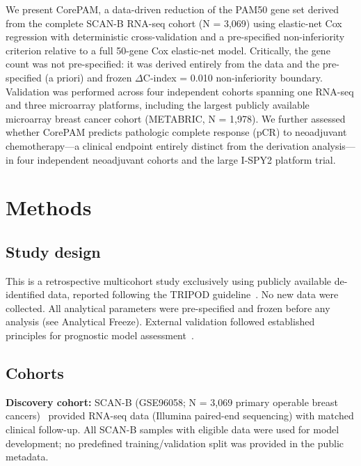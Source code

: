 \documentclass[referee,lineno,pdflatex,sn-vancouver-num]{sn-jnl}
\begin{document}
We present CorePAM, a data-driven reduction of the PAM50 gene set derived from the complete SCAN-B RNA-seq cohort (N = 3,069) using elastic-net Cox regression with deterministic cross-validation and a pre-specified non-inferiority criterion relative to a full 50-gene Cox elastic-net model. Critically, the gene count was not pre-specified: it was derived entirely from the data and the pre-specified (a priori) and frozen $\Delta$C-index = 0.010 non-inferiority boundary. Validation was performed across four independent cohorts spanning one RNA-seq and three microarray platforms, including the largest publicly available microarray breast cancer cohort (METABRIC, N = 1,978). We further assessed whether CorePAM predicts pathologic complete response (pCR) to neoadjuvant chemotherapy---a clinical endpoint entirely distinct from the derivation analysis---in four independent neoadjuvant cohorts and the large I-SPY2 platform trial.

\section{Methods}\label{sec:methods}

\subsection{Study design}\label{subsec:study-design}

This is a retrospective multicohort study exclusively using publicly available de-identified data, reported following the TRIPOD guideline~\cite{moons2015}. No new data were collected. All analytical parameters were pre-specified and frozen before any analysis (see Analytical Freeze). External validation followed established principles for prognostic model assessment~\cite{royston2013}.

\subsection{Cohorts}\label{subsec:cohorts}

\textbf{Discovery cohort:} SCAN-B (GSE96058; N = 3,069 primary operable breast cancers)~\cite{brueffer2018,saal2015} provided RNA-seq data (Illumina paired-end sequencing) with matched clinical follow-up. All SCAN-B samples with eligible data were used for model development; no predefined training/validation split was provided in the public metadata.
\end{document}
